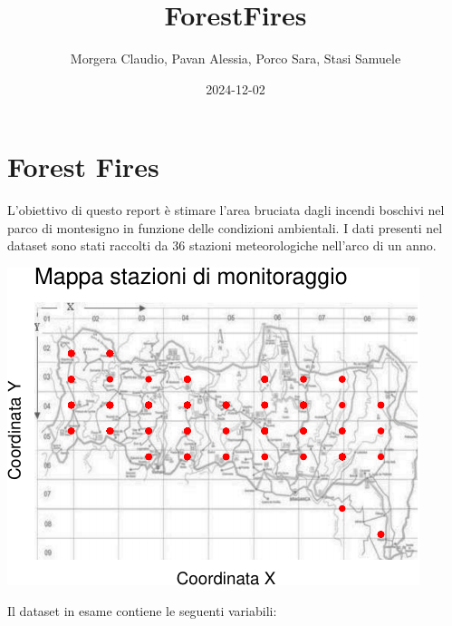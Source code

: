 \documentclass[
]{article}
\title{ForestFires}
\author{Morgera Claudio, Pavan Alessia, Porco Sara, Stasi Samuele}
\date{2024-12-02}
\begin{document}
\maketitle

\section{Forest Fires}\label{forest-fires}

L'obiettivo di questo report è stimare l'area bruciata dagli incendi
boschivi nel parco di montesigno in funzione delle condizioni
ambientali. I dati presenti nel dataset sono stati raccolti da 36
stazioni meteorologiche nell'arco di un anno. \newline

\begin{center}\includegraphics{ForestFires_files/figure-latex/mappa-1} \end{center}

Il dataset in esame contiene le seguenti variabili:
\end{document}
